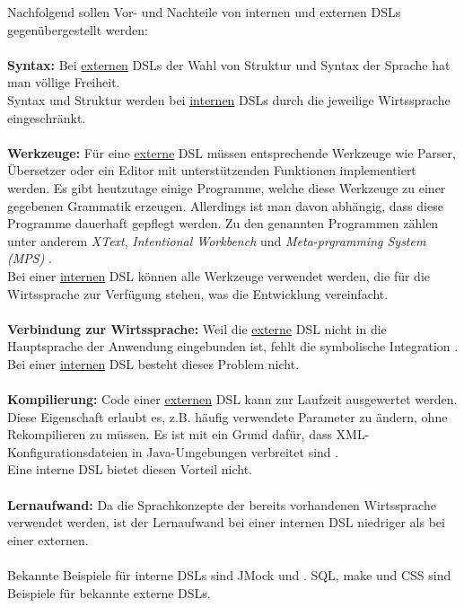 Nachfolgend sollen Vor- und Nachteile von internen und externen DSLs gegenübergestellt werden:
\\ \\
\textbf{Syntax:}
Bei \underline{externen} DSLs der Wahl von Struktur und Syntax der Sprache hat man völlige Freiheit.\\
Syntax und Struktur werden bei \underline{internen} DSLs durch die jeweilige Wirtssprache eingeschränkt.
\\ \\
\textbf{Werkzeuge:}
Für eine \underline{externe} DSL müssen entsprechende Werkzeuge wie Parser, Übersetzer oder ein Editor mit unterstützenden Funktionen implementiert 
werden. Es gibt heutzutage einige Programme, welche diese Werkzeuge zu einer gegebenen Grammatik erzeugen. Allerdings ist man davon abhängig, dass 
diese Programme dauerhaft gepflegt werden. Zu den genannten Programmen zählen unter anderem \emph{XText}\cite{www:xtext}, \emph{Intentional 
Workbench} \cite{www:intentsoft} und \emph{Meta-prgramming System (MPS)} \cite{www:mps}.\\
Bei einer \underline{internen} DSL können alle Werkzeuge verwendet werden, die für die Wirtssprache zur Verfügung stehen, was die Entwicklung vereinfacht.
\\ \\
\textbf{Verbindung zur Wirtssprache:}
Weil die \underline{externe} DSL nicht in die Hauptsprache der Anwendung eingebunden ist, fehlt die symbolische Integration \cite{www:fowlerWorkbench}.\\
Bei einer \underline{internen} DSL besteht dieses Problem nicht.
\\ \\
\textbf{Kompilierung:}
Code einer \underline{externen} DSL kann zur Laufzeit ausgewertet werden. Diese Eigenschaft erlaubt es, z.B. häufig verwendete Parameter zu ändern, ohne 
Rekompilieren zu müssen. Es ist mit ein Grund dafür, dass XML-Konfigurationsdateien in Java-Umgebungen verbreitet sind \cite{www:fowlerWorkbench}.\\
Eine interne DSL bietet diesen Vorteil nicht.
\\ \\
\textbf{Lernaufwand:}
Da die Sprachkonzepte der bereits vorhandenen Wirtssprache verwendet werden, ist der Lernaufwand bei einer internen DSL niedriger als bei einer externen.
\\ \\ %
Bekannte Beispiele für interne DSLs sind JMock und . SQL, make und CSS sind Beispiele für bekannte externe DSLs.


